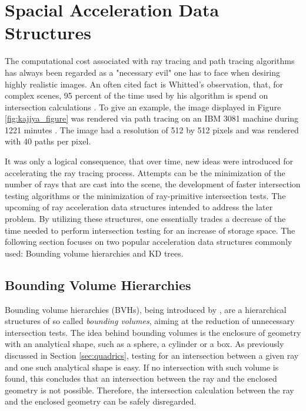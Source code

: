 \section{Spacial Acceleration Data Structures} \label{sec:acceleration}
The computational cost associated with ray tracing and path tracing algorithms has always been regarded as a "necessary evil" one has to face when desiring highly realistic images. An often cited fact is Whitted's observation, that, for complex scenes, 95 percent of the time used by his algorithm is spend on intersection calculations \cite[p 349]{whitted1979improved}. To give an example, the image displayed in Figure \ref{fig:kajiya_figure} was rendered via path tracing on an IBM 3081 machine during 1221 minutes \cite[p 149]{kajiya1986rendering}. The image had a resolution of 512 by 512 pixels and was rendered with 40 paths per pixel.

It was only a logical consequence, that over time, new ideas were introduced for accelerating the ray tracing process. Attempts can be the minimization of the number of rays that are cast into the scene, the development of faster intersection testing algorithms or the minimization of ray-primitive intersection tests. The upcoming of ray acceleration data structures intended to address the later problem. By utilizing these structures, one essentially trades a decrease of the time needed to perform intersection testing for an increase of storage space. The following section focuses on two popular acceleration data structures commonly used: Bounding volume hierarchies and KD trees.

\subsection{Bounding Volume Hierarchies}

Bounding volume hierarchies (BVHs), being introduced by \cite{rubin19803}, are a hierarchical structures of so called \emph{bounding volumes}, aiming at the reduction of unnecessary intersection tests. The idea behind bounding volumes is the enclosure of geometry with an analytical shape, such as a sphere, a cylinder or a box. As previously discussed in Section \ref{sec:quadrics}, testing for an intersection between a given ray and one such analytical shape is easy. If no intersection with such volume is found, this concludes that an intersection between the ray and the enclosed geometry is not possible. Therefore, the intersection calculation between the ray and the enclosed geometry can be safely disregarded. 

